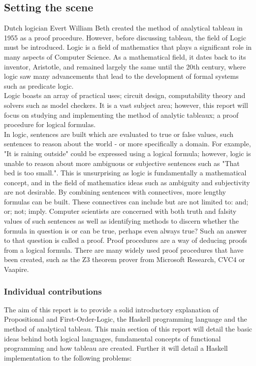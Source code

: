 \documentclass{article}%
\begin{document}
\subsection{Setting the scene}
Dutch logician Evert William Beth created the method of analytical tableau in 1955 as a proof procedure. However, before discussing tableau, the field of Logic must be introduced.
Logic is a field of mathematics that plays a significant role in many aspects of Computer Science. As a mathematical field, it dates back to its inventor, Aristotle, and remained largely the same until the 20th century, where logic saw many advancements that lead to the development of formal systems such as predicate logic. \\
Logic boasts an array of practical uses; circuit design, computability theory and solvers such as model checkers. It is a vast subject area; however, this report will focus on studying and implementing the method of analytic tableaux; a proof procedure for logical formulas.\\
In logic, sentences are built which are evaluated to true or false values, such sentences to reason about the world - or more specifically a domain. For example, "It is raining outside" could be expressed using a logical formula; however, logic is unable to reason about more ambiguous or subjective sentences such as "That bed is too small.". This is unsurprising as logic is fundamentally a mathematical concept, and in the field of mathematics ideas such as ambiguity and subjectivity are not desirable. By combining sentences with connectives, more lengthy formulas can be built. These connectives can include but are not limited to: and; or; not; imply. Computer scientists are concerned with both truth and falsity values of such sentences as well as identifying methods to discern whether the formula in question is or can be true, perhaps even always true? Such an answer to that question is called a proof. Proof procedures are a way of deducing proofs from a logical formula. There are many widely used proof procedures that have been created, such as the Z3 theorem prover from Microsoft Research, CVC4 or Vaapire.\subsubsection{Individual contributions}
The aim of this report is to provide a solid introductory explanation of Propositional and First-Order-Logic, the Haskell programming language and the method of analytical tableau. This main section of this report will detail the basic ideas behind both logical languages, fundamental concepts of functional programming and how tableau are created. Further it will detail a Haskell implementation to the following problems:
\end{document}
